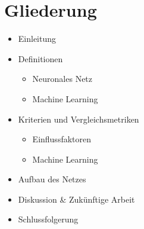 \documentclass[10pt,a4paper]{article}
\begin{document}
\section{Gliederung}
\begin{itemize}
\item Einleitung
\item Definitionen
\begin{itemize}
\item Neuronales Netz
\item Machine Learning
\end{itemize}
\item Kriterien und Vergleichsmetriken
\begin{itemize}
\item Einflussfaktoren
\item Machine Learning
\end{itemize}
\item Aufbau des Netzes
\item Diskussion \& Zukünftige Arbeit
\item Schlussfolgerung
\end{itemize}


%
%

%


\end{document}
